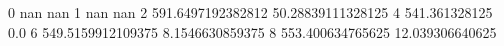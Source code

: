 0 nan nan
1 nan nan
2 591.6497192382812 50.28839111328125
4 541.361328125 0.0
6 549.5159912109375 8.1546630859375
8 553.400634765625 12.039306640625

